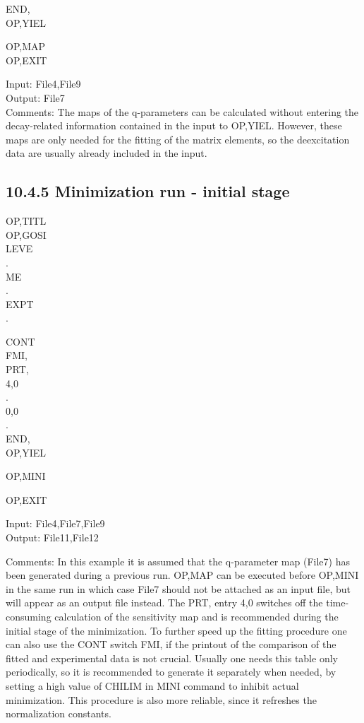 \documentclass[10pt]{article}
\begin{document}
END,\\
OP,YIEL

OP,MAP\\
OP,EXIT

Input: File4,File9\\
Output: File7\\
Comments: The maps of the q-parameters can be calculated without entering the decay-related information contained in the input to OP,YIEL. However, these maps are only needed for the fitting of the matrix elements, so the deexcitation data are usually already included in the input.

\subsection*{10.4.5 Minimization run - initial stage}
OP,TITL\\
OP,GOSI\\
LEVE\\
.\\
ME\\
.\\
EXPT\\
.

CONT\\
FMI,\\
PRT,\\
4,0\\
.\\
0,0\\
.\\
END,\\
OP,YIEL

OP,MINI

OP,EXIT

Input: File4,File7,File9\\
Output: File11,File12

Comments: In this example it is assumed that the q-parameter map (File7) has been generated during a previous run. OP,MAP can be executed before OP,MINI in the same run in which case File7 should not be attached as an input file, but will appear as an output file instead. The PRT, entry 4,0 switches off the time-consuming calculation of the sensitivity map and is recommended during the initial stage of the minimization. To further speed up the fitting procedure one can also use the CONT switch FMI, if the printout of the comparison of the fitted and experimental data is not crucial. Usually one needs this table only periodically, so it is recommended to generate it separately when needed, by setting a high value of CHILIM in MINI command to inhibit actual minimization. This procedure is also more reliable, since it refreshes the normalization constants.
\end{document}
